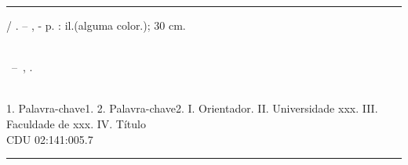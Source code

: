 

\begin{fichacatalografica}

\sffamily
\vspace*{15cm} %
\hrule %

\begin{center} %

\begin{minipage}[c]{12.5cm} %
\imprimirautor
\hspace{0.5cm} \imprimirtitulo / \imprimirautor. --
\imprimirlocal, \imprimirdata-
\hspace{0.5cm} \pageref{LastPage} p. : il.(alguma color.); 30 cm.\\
\hspace{0.5cm} \imprimirorientadorRotulo \imprimirorientador\\
\hspace{0.5cm}
\parbox[t]{\textwidth}{\imprimirtipotrabalho~--~\imprimirinstituicao,
\imprimirdata.}\\
\hspace{0.5cm}
1. Palavra-chave1.
2. Palavra-chave2.
I. Orientador.
II. Universidade xxx.
III. Faculdade de xxx.
IV. Título\\
\hspace{8.75cm} CDU 02:141:005.7\\
\end{minipage}

\end{center}

\hrule

\end{fichacatalografica}
